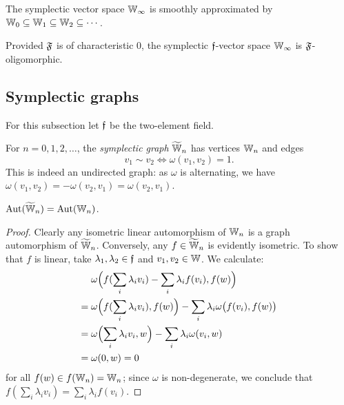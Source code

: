 \begin{theorem}\label{thm:symplectic-smooth-approximation}
    The symplectic vector space $\mathbb{W}_\infty$ is smoothly approximated by 
    $\mathbb{W}_0 \subseteq \mathbb{W}_1 \subseteq \mathbb{W}_2 \subseteq \cdots$.
\end{theorem}

\begin{corollary}
    Provided $\mathfrak{F}$ is of characteristic $0$, the symplectic $\mathfrak{f}$-vector space $\mathbb{W}_\infty$ is $\mathfrak{F}$-oligomorphic.
\end{corollary}




\subsection{Symplectic graphs}
For this subsection let $\mathfrak{f}$ be the two-element field.
\begin{definition}
    For $n = 0, 1, 2, \ldots$, the \emph{symplectic graph} $\widetilde {\mathbb{W}}_n$ has vertices $\mathbb{W}_n$ and edges
    \[
        v_1 \sim v_2 \iff \omega(v_1, v_2) = 1.
    \]
    This is indeed an undirected graph: as $\omega$ is alternating, we have $\omega(v_1, v_2) = -\omega(v_2, v_1) = \omega(v_2, v_1)$.    
\end{definition}

\begin{proposition}\label{prop:symplectic-vs-graph}
    $\operatorname{Aut}(\widetilde {\mathbb{W}}_n) = \operatorname{Aut}(\mathbb{W}_n)$.
\end{proposition}
\begin{proof}
    Clearly any isometric linear automorphism of $\mathbb{W}_n$ is a graph automorphism of $\widetilde {\mathbb{W}}_n$.
    Conversely, any $f \in \widetilde {\mathbb{W}}_n$ is evidently isometric.
    To show that $f$ is linear, take $\lambda_1, \lambda_2 \in \mathfrak{f}$ and $v_1, v_2 \in \mathbb{W}$.
    We calculate:
    \begin{align*}
        &\omega\Bigl( f(\sum_i \lambda_i v_i) - \sum_i \lambda_i f(v_i) , f(w) \Bigr) \\
        ={}& \omega\Bigl( f(\sum_i \lambda_i v_i), f(w)\Bigr) - \sum_i \lambda_i \omega\bigl(f(v_i), f(w) \bigr) \\
        ={}& \omega\Bigl( \sum_i \lambda_i v_i, w \Bigr) - \sum_i \lambda_i \omega( v_i, w ) \\
        ={}& \omega(0, w) = 0
    \end{align*}
    for all $f(w) \in f(\mathbb{W}_n) = \mathbb{W}_n$;
    since $\omega$ is non-degenerate, 
    we conclude that $f(\sum_i \lambda_i v_i) = \sum_i \lambda_i f(v_i)$.
\end{proof}

